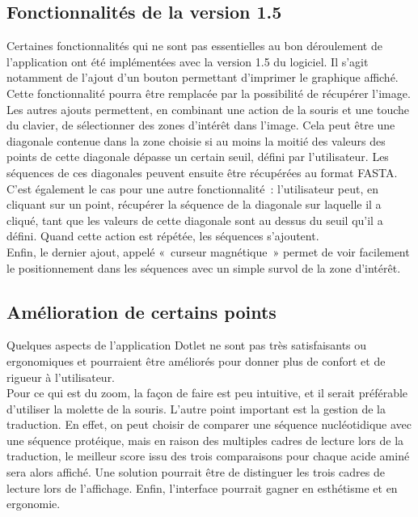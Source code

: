 \documentclass{report}
\begin{document}
\subsection{Fonctionnalités de la version 1.5}
Certaines fonctionnalités qui ne sont pas essentielles au bon déroulement de l'application ont été implémentées avec la version 1.5 du logiciel. Il s'agit notamment de l'ajout d'un bouton permettant d'imprimer le graphique affiché. Cette fonctionnalité pourra être remplacée par la possibilité de récupérer l'image.\\
Les autres ajouts permettent, en combinant une action de la souris et une touche du clavier, de sélectionner des zones d'intérêt dans l'image. Cela peut être une diagonale contenue dans la zone choisie si au moins la moitié des valeurs des points de cette diagonale dépasse un certain seuil, défini par l'utilisateur. Les séquences de ces diagonales peuvent ensuite être récupérées au format FASTA.\\
C'est également le cas pour une autre fonctionnalité~: l'utilisateur peut, en cliquant sur un point, récupérer la séquence de la diagonale sur laquelle il a cliqué, tant que les valeurs de cette diagonale sont au dessus du seuil qu'il a défini. Quand cette action est répétée, les séquences s'ajoutent.\\
Enfin, le dernier ajout, appelé «~curseur magnétique~» permet de voir facilement le positionnement dans les séquences avec un simple survol de la zone d'intérêt.

\subsection{Amélioration de certains points}
Quelques aspects de l'application Dotlet ne sont pas très satisfaisants ou ergonomiques et pourraient être améliorés pour donner plus de confort et de rigueur à l'utilisateur.\\
Pour ce qui est du zoom, la façon de faire est peu intuitive, et il serait préférable d'utiliser la molette de la souris. L'autre point important est la gestion de la traduction. En effet, on peut choisir de comparer une séquence nucléotidique avec une séquence protéique, mais en raison des multiples cadres de lecture lors de la traduction, le meilleur score issu des trois comparaisons pour chaque acide aminé sera alors affiché. Une solution pourrait être de distinguer les trois cadres de lecture lors de l'affichage. Enfin, l'interface pourrait gagner en esthétisme et en ergonomie.
\end{document}
